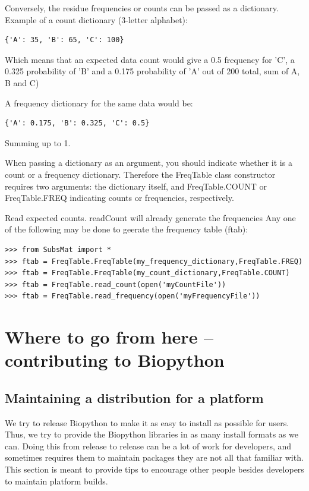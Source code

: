 \documentclass{report}
\begin{document}
\begin{enumerate}
Conversely, the residue frequencies or counts can be passed as a dictionary. 
Example of a count dictionary (3-letter alphabet):

\begin{verbatim}
{'A': 35, 'B': 65, 'C': 100}
\end{verbatim}

Which means that an expected data count would give a 0.5 frequency 
for 'C', a 0.325 probability of 'B' and a 0.175 probability of 'A' 
out of 200 total, sum of A, B and C)
 
 A frequency dictionary for the same data would be:

\begin{verbatim}
{'A': 0.175, 'B': 0.325, 'C': 0.5}
\end{verbatim}

Summing up to 1.

When passing a dictionary as an argument, you should indicate whether it is a count or a frequency dictionary. Therefore the FreqTable class constructor requires two arguments: the dictionary itself, and FreqTable.COUNT or FreqTable.FREQ indicating counts or frequencies, respectively.


Read expected counts. readCount will already generate the frequencies
Any one of the following may be done to geerate the frequency table (ftab):

\begin{verbatim}
>>> from SubsMat import *
>>> ftab = FreqTable.FreqTable(my_frequency_dictionary,FreqTable.FREQ)
>>> ftab = FreqTable.FreqTable(my_count_dictionary,FreqTable.COUNT)
>>> ftab = FreqTable.read_count(open('myCountFile'))
>>> ftab = FreqTable.read_frequency(open('myFrequencyFile'))
\end{verbatim}

\end{enumerate}

\chapter{Where to go from here -- contributing to Biopython}

\section{Maintaining a distribution for a platform}
\label{sec:maintain_dist}

We try to release Biopython to make it as easy to install as possible for users. Thus, we try to provide the Biopython libraries in as many install formats as we can. Doing this from release to release can be a lot of work for developers, and sometimes requires them to maintain packages they are not all that familiar with. This section is meant to provide tips to encourage other people besides developers to maintain platform builds.
\end{document}
